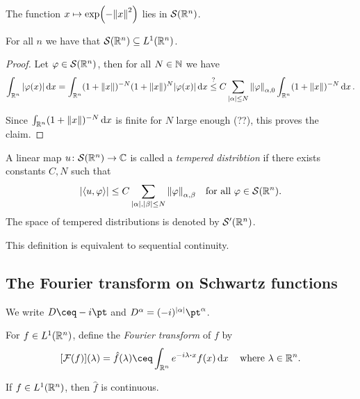 \begin{example}
	The function $x \mapsto \exp(-\norm{x}^2)$ lies in $\mathcal S(\mathbb R^n)$. 
\end{example}

\begin{proposition}
	For all $n$ we have that $\mathcal S(\mathbb R^n) \subseteq L^1(\mathbb R^n)$. 
\end{proposition}

\begin{proof}
	Let $\varphi \in \mathcal S(\mathbb R^n)$, then for all $N \in \mathbb N$ we have
	\[
	\int_{\mathbb R^n} \abs{\varphi(x)} \dd{x} = \int_{\mathbb R^n} (1 + \norm{x})^{-N} (1 + \norm{x})^N \abs{\varphi(x)} \dd{x} \overset?\leq C\sum_{\abs{\alpha} \leq N} \norm{\varphi}_{\alpha, 0} \int_{\mathbb R^n} (1 + \norm{x})^{-N} \dd{x}.
	\]
	
	Since $\int_{\mathbb R^n} (1 + \norm{x})^{-N} \dd{x}$ is finite for $N$ large enough (??), this proves the claim. 
\end{proof}


\begin{definition}
	A linear map $u \colon \mathcal S(\mathbb R^n) \to \mathbb C$ is called a \emph{tempered distribtion} if there exists constants $C, N$ such that
	\[
	\abs{\langle u, \varphi\rangle} \leq C \sum_{\abs{\alpha}, \abs{\beta} \leq N} \norm{\varphi}_{\alpha, \beta} \quad\text{for all $\varphi \in \mathcal S(\mathbb R^n)$}. 
	\]
	The space of tempered distributions is denoted by $\mathcal S'(\mathbb R^n)$. 
\end{definition}

This definition is equivalent to sequential continuity. 

\subsection{The Fourier transform on Schwartz functions}

\begin{convention}
	We write $D \ceq -i\pt$ and $D^\alpha = (-i)^{\abs{\alpha}} \pt^\alpha$. 
\end{convention}

\begin{definition}
	For $f \in L^1(\mathbb R^n)$, define the \emph{Fourier transform} of $f$ by  
	\[
	[\FF(f)](\lambda) = \hat f(\lambda) \ceq \int_{\RR^n} e^{-i\lambda \vdot x} f(x) \dd{x} \quad\text{where $\lambda \in \RR^n$}. 
	\]
\end{definition}

\begin{lemma}
	If $f \in L^1(\mathbb R^n)$, then $\hat f$ is continuous. 
\end{lemma}

